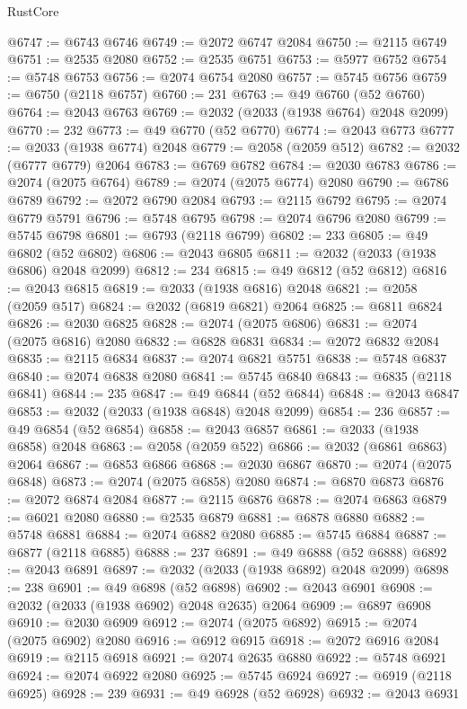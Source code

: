 \begin{lexlean}{RustCore}
\begin{coremodule}
@6747 := @6743 @6746
@6749 := @2072 @6747 @2084
@6750 := @2115 @6749
@6751 := @2535 @2080
@6752 := @2535 @6751
@6753 := @5977 @6752
@6754 := @5748 @6753
@6756 := @2074 @6754 @2080
@6757 := @5745 @6756
@6759 := @6750 (@2118 @6757)
@6760 := 231
@6763 := @49 @6760 (@52 @6760)
@6764 := @2043 @6763
@6769 := @2032 (@2033 (@1938 @6764) @2048 @2099)
@6770 := 232
@6773 := @49 @6770 (@52 @6770)
@6774 := @2043 @6773
@6777 := @2033 (@1938 @6774) @2048
@6779 := @2058 (@2059 @512)
@6782 := @2032 (@6777 @6779) @2064
@6783 := @6769 @6782
@6784 := @2030 @6783
@6786 := @2074 (@2075 @6764)
@6789 := @2074 (@2075 @6774) @2080
@6790 := @6786 @6789
@6792 := @2072 @6790 @2084
@6793 := @2115 @6792
@6795 := @2074 @6779 @5791
@6796 := @5748 @6795
@6798 := @2074 @6796 @2080
@6799 := @5745 @6798
@6801 := @6793 (@2118 @6799)
@6802 := 233
@6805 := @49 @6802 (@52 @6802)
@6806 := @2043 @6805
@6811 := @2032 (@2033 (@1938 @6806) @2048 @2099)
@6812 := 234
@6815 := @49 @6812 (@52 @6812)
@6816 := @2043 @6815
@6819 := @2033 (@1938 @6816) @2048
@6821 := @2058 (@2059 @517)
@6824 := @2032 (@6819 @6821) @2064
@6825 := @6811 @6824
@6826 := @2030 @6825
@6828 := @2074 (@2075 @6806)
@6831 := @2074 (@2075 @6816) @2080
@6832 := @6828 @6831
@6834 := @2072 @6832 @2084
@6835 := @2115 @6834
@6837 := @2074 @6821 @5751
@6838 := @5748 @6837
@6840 := @2074 @6838 @2080
@6841 := @5745 @6840
@6843 := @6835 (@2118 @6841)
@6844 := 235
@6847 := @49 @6844 (@52 @6844)
@6848 := @2043 @6847
@6853 := @2032 (@2033 (@1938 @6848) @2048 @2099)
@6854 := 236
@6857 := @49 @6854 (@52 @6854)
@6858 := @2043 @6857
@6861 := @2033 (@1938 @6858) @2048
@6863 := @2058 (@2059 @522)
@6866 := @2032 (@6861 @6863) @2064
@6867 := @6853 @6866
@6868 := @2030 @6867
@6870 := @2074 (@2075 @6848)
@6873 := @2074 (@2075 @6858) @2080
@6874 := @6870 @6873
@6876 := @2072 @6874 @2084
@6877 := @2115 @6876
@6878 := @2074 @6863
@6879 := @6021 @2080
@6880 := @2535 @6879
@6881 := @6878 @6880
@6882 := @5748 @6881
@6884 := @2074 @6882 @2080
@6885 := @5745 @6884
@6887 := @6877 (@2118 @6885)
@6888 := 237
@6891 := @49 @6888 (@52 @6888)
@6892 := @2043 @6891
@6897 := @2032 (@2033 (@1938 @6892) @2048 @2099)
@6898 := 238
@6901 := @49 @6898 (@52 @6898)
@6902 := @2043 @6901
@6908 := @2032 (@2033 (@1938 @6902) @2048 @2635) @2064
@6909 := @6897 @6908
@6910 := @2030 @6909
@6912 := @2074 (@2075 @6892)
@6915 := @2074 (@2075 @6902) @2080
@6916 := @6912 @6915
@6918 := @2072 @6916 @2084
@6919 := @2115 @6918
@6921 := @2074 @2635 @6880
@6922 := @5748 @6921
@6924 := @2074 @6922 @2080
@6925 := @5745 @6924
@6927 := @6919 (@2118 @6925)
@6928 := 239
@6931 := @49 @6928 (@52 @6928)
@6932 := @2043 @6931

\end{coremodule}
\end{lexlean}
